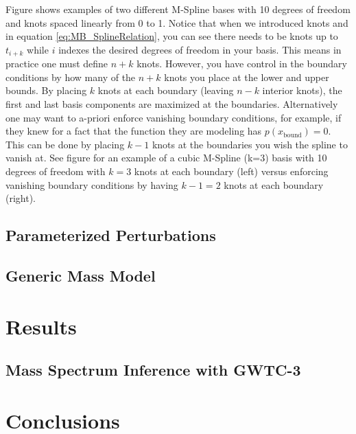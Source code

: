 \documentclass[twocolumn, linenumber]{aastex63}
\begin{document}
Figure shows examples of two different M-Spline bases with 10 degrees of freedom and knots spaced linearly from 0 to 1. Notice that when we introduced knots and in equation \ref{eq:MB_SplineRelation}, you can see there needs to be knots up to $t_{i+k}$ while $i$ indexes the desired degrees of freedom in your basis. This means in practice one must define $n+k$ knots. However, you have control in the boundary conditions by how many of the $n+k$ knots you place at the lower and upper bounds. By placing $k$ knots at each boundary (leaving $n-k$ interior knots), the first and last basis components are maximized at the boundaries. Alternatively one may want to a-priori enforce vanishing boundary conditions, for example, if they knew for a fact that the function they are modeling has $p(x_\mathrm{bound}) = 0$.  This can be done by placing $k-1$ knots at the boundaries you wish the spline to vanish at. See figure for an example of a cubic M-Spline (k=3) basis with 10 degrees of freedom with $k=3$ knots at each boundary (left) versus enforcing vanishing boundary conditions by having $k-1=2$ knots at each boundary (right).



\subsection{Parameterized Perturbations} \label{sec:perturbation_model}
\subsection{Generic Mass Model} \label{sec:nonparametric_model}
\section{Results} \label{sec:results}
\subsection{Mass Spectrum Inference with GWTC-3} \label{sec:GWTC3_inferece}
\section{Conclusions}\label{sec:conclusion}
\end{document}
